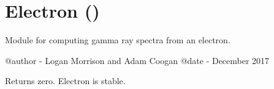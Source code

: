 \documentclass[letterpaper,10pt,english]{sphinxmanual}
\begin{document}
\section{Electron ()}
\label{\detokenize{modules:module-hazma.electron}}\label{\detokenize{modules:electron-hazma-electron}}
Module for computing gamma ray spectra from an electron.

@author - Logan Morrison and Adam Coogan
@date - December 2017

\begin{fulllineitems}
\label{\detokenize{modules:hazma.electron.decay_spectra}}
Returns zero. Electron is stable.

\end{fulllineitems}

\end{document}
